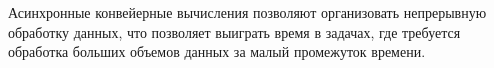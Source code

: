 \documentclass[12pt]{report}
\begin{document}
 Асинхронные конвейерные вычисления позволяют организовать непрерывную обработку данных, что позволяет выиграть время в задачах, где требуется обработка больших объемов данных за малый промежуток времени.



\end{document}
